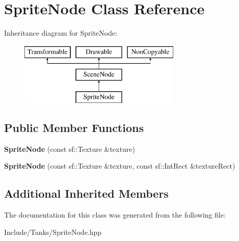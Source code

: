 \hypertarget{class_sprite_node}{}\section{Sprite\+Node Class Reference}
\label{class_sprite_node}
Inheritance diagram for Sprite\+Node\+:\begin{figure}[H]
\begin{center}
\leavevmode
\includegraphics[height=3.000000cm]{class_sprite_node}
\end{center}
\end{figure}
\subsection*{Public Member Functions}
\begin{DoxyCompactItemize}
\item 
\hypertarget{class_sprite_node_ad72b769f4c57e5d77a8d6ba223f487b0}{}{\bfseries Sprite\+Node} (const sf\+::\+Texture \&texture)\label{class_sprite_node_ad72b769f4c57e5d77a8d6ba223f487b0}

\item 
\hypertarget{class_sprite_node_ac12927969dcfd6f02da372e7e22c2af1}{}{\bfseries Sprite\+Node} (const sf\+::\+Texture \&texture, const sf\+::\+Int\+Rect \&texture\+Rect)\label{class_sprite_node_ac12927969dcfd6f02da372e7e22c2af1}

\end{DoxyCompactItemize}
\subsection*{Additional Inherited Members}


The documentation for this class was generated from the following file\+:\begin{DoxyCompactItemize}
\item 
Include/\+Tanks/Sprite\+Node.\+hpp\end{DoxyCompactItemize}
